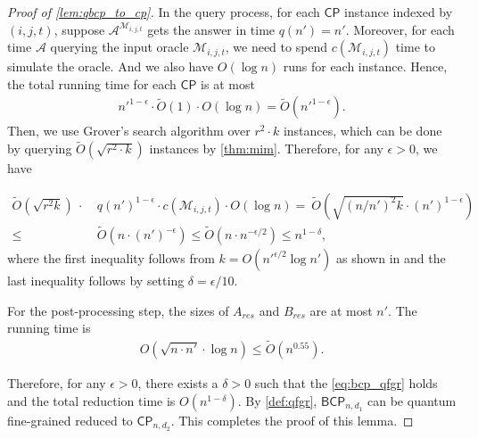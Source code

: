 \documentclass[10pt,a4paper]{article}
\newcommand{\wt}{\widetilde}
\newcommand{\eps}{\epsilon}
\renewcommand{\eps}{\epsilon}
\newcommand{\CP}{\ensuremath{\mathsf{CP}}}
\newcommand{\BCP}{\ensuremath{\mathsf{BCP}}}
\begin{document}
\begin{proof}[Proof of \cref{lem:qbcp_to_cp}]
In the query process, for each $\CP$ instance indexed by $(i,j,t)$, suppose $\mathcal{A}^{\mathcal{M}_{i,j,t}}$ gets the answer in time $q(n')=n'$. Moreover, for each time $\mathcal{A}$ querying the input oracle $\mathcal{M}_{i,j,t}$, we need to spend $c(\mathcal{M}_{i,j,t})$ time to simulate the oracle. And we also have $O(\log n)$ runs for each instance. Hence, the total running time for each $\CP$ is at most  
\begin{align}
    n'^{1-\epsilon}\cdot \wt{O}(1)\cdot O(\log n)=\wt{O}(n'^{1-\epsilon}).
\end{align}
Then, we use Grover's search algorithm over $r^2\cdot k$ instances, which can be done by querying $\wt{O}(\sqrt{r^2\cdot k})$ instances by \cref{thm:mim}. Therefore, for any $\epsilon > 0$, we have

\begin{align}\label{eq:bcp_qfgr}
    \wt{O}(\sqrt{r^2 k})~\cdot &~ q(n')^{1-\epsilon}\cdot c(\mathcal{M}_{i,j,t})\cdot O(\log n) =  ~ 
    \wt{O}(\sqrt{(n/n')^2 k}\cdot(n')^{1-\eps}) \\
    \leq &~ \wt{O}(n\cdot (n')^{-\eps})
    \leq \wt{O}(n\cdot n^{-\eps/2})
    \leq n^{1-\delta},
\end{align}
where the first inequality follows from $k=O(n'^{\epsilon / 2}\log n')$ as shown in \cite{r29} and the last inequality follows by setting $\delta = \epsilon / 10$.

For the post-processing step, the sizes of $A_{res}$ and $B_{res}$ are at most $n'$. The running time is 
\begin{align}
    O(\sqrt{n\cdot n'}\cdot \log n) \leq \wt{O}(n^{0.55}).
\end{align}

Therefore, for any $\epsilon>0$, there exists a $\delta>0$ such that the \cref{eq:bcp_qfgr} holds and the total reduction time is $O(n^{1-\delta})$. By \cref{def:qfgr}, $\BCP_{n,d_1}$ can be quantum fine-grained reduced to $\CP_{n,d_2}$. This completes the proof of this lemma. 
\end{proof}
\end{document}
